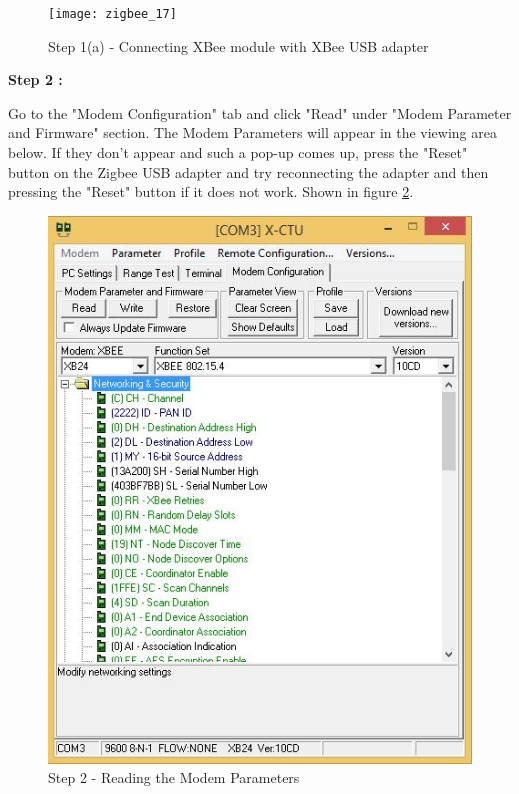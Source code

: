 \begin{flushleft}
\begin{figure}[h]
\begin{center}
\texttt{[image: zigbee\_17]}
\end{center}
\caption{Step 1(a) - Connecting XBee module with XBee USB adapter}
\label{xstep1.2}
\end{figure}

\newpage
\textbf{Step 2 :}
\medskip

Go to the "Modem Configuration" tab and click "Read" under "Modem Parameter and Firmware" section. The Modem Parameters will appear in the viewing area below. If they don't appear and such a pop-up comes up, press the "Reset" button on the Zigbee USB adapter and try reconnecting the adapter and then pressing the "Reset" button if it does not work.
Shown in figure \ref{xstep2}.

\medskip

\begin{figure}[h]
\begin{center}
\includegraphics[scale=0.5]{zigbee_11}
\end{center}
\caption{Step 2 - Reading the Modem Parameters}
\label{xstep2}
\end{figure}



\end{flushleft}
